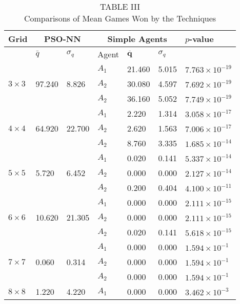 \documentclass[10pt]{article}
\begin{document}
\begin{table}[h]
\begin{center}
\captionsetup{labelformat=empty}
\caption{TABLE III\\
Comparisons of Mean Games Won by the Techniques}
\begin{tabular}{|l|l|l|l|l|l|l|}
\hline
\multirow{2}{*}{Grid} & \multicolumn{2}{|c|}{PSO-NN} & \multicolumn{3}{|c|}{Simple Agents} & \multirow{2}{*}{$p$-value} \\
\hline
 & $\bar{q}$ & $\sigma_{q}$ & Agent & $\overline{\boldsymbol{q}}$ & $\sigma_{q}$ &  \\
\hline
\multirow{3}{*}{$3 \times 3$} &  &  & $A_{1}$ & 21.460 & 5.015 & $7.763 \times 10^{-19}$ \\
\hline
 & 97.240 & 8.826 & $A_{2}$ & 30.080 & 4.597 & $7.692 \times 10^{-19}$ \\
\hline
 &  &  & $A_{2}$ & 36.160 & 5.052 & $7.749 \times 10^{-19}$ \\
\hline
\multirow{3}{*}{$4 \times 4$} &  &  & $A_{1}$ & 2.220 & 1.314 & $3.058 \times 10^{-17}$ \\
\hline
 & 64.920 & 22.700 & $A_{2}$ & 2.620 & 1.563 & $7.006 \times 10^{-17}$ \\
\hline
 &  &  & $A_{2}$ & 8.760 & 3.335 & $1.685 \times 10^{-14}$ \\
\hline
\multirow{3}{*}{$5 \times 5$} &  &  & $A_{1}$ & 0.020 & 0.141 & $5.337 \times 10^{-14}$ \\
\hline
 & 5.720 & 6.452 & $A_{2}$ & 0.000 & 0.000 & $2.127 \times 10^{-14}$ \\
\hline
 &  &  & $A_{2}$ & 0.200 & 0.404 & $4.100 \times 10^{-11}$ \\
\hline
\multirow{3}{*}{$6 \times 6$} & \multirow{3}{*}{10.620} & \multirow{3}{*}{21.305} & $A_{1}$ & 0.000 & 0.000 & $2.111 \times 10^{-15}$ \\
\hline
 &  &  & $A_{2}$ & 0.000 & 0.000 & $2.111 \times 10^{-15}$ \\
\hline
 &  &  & $A_{2}$ & 0.020 & 0.141 & $5.618 \times 10^{-15}$ \\
\hline
\multirow{3}{*}{$7 \times 7$} & \multirow{3}{*}{0.060} & \multirow{3}{*}{0.314} & $A_{1}$ & 0.000 & 0.000 & $1.594 \times 10^{-1}$ \\
\hline
 &  &  & $A_{2}$ & 0.000 & 0.000 & $1.594 \times 10^{-1}$ \\
\hline
 &  &  & $A_{2}$ & 0.000 & 0.000 & $1.594 \times 10^{-1}$ \\
\hline
\multirow{3}{*}{$8 \times 8$} & \multirow{3}{*}{1.220} & \multirow{3}{*}{4.220} & $A_{1}$ & 0.000 & 0.000 & $3.462 \times 10^{-3}$ \\

\end{tabular}
\end{center}
\end{table}
\end{document}
